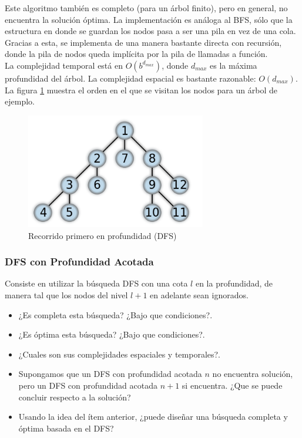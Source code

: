 \documentclass[11pt,a4paper]{article}
\begin{document}
Este algoritmo también es completo (para un árbol finito), pero en general, no encuentra la solución óptima. La implementación es análoga al BFS, sólo que la estructura en donde se guardan los nodos pasa a ser una pila en vez de una cola. Gracias a esta, se implementa de una manera bastante directa con recursión, donde la pila de nodos queda implícita por la pila de llamadas a función. \\

La complejidad temporal está en $O(b^{d_{max}})$, donde $d_{max}$ es la máxima profundidad del árbol. La complejidad espacial es bastante razonable: $O(d_{max})$. \\

La figura \ref{fig:DFS} muestra el orden en el que se visitan los nodos para un árbol de ejemplo.

{
\begin{figure}[]
  \centering
    \includegraphics[width=0.7\textwidth]{img/DFS}
  \caption{Recorrido primero en profundidad (DFS)}
  \label{fig:DFS}
\end{figure}
}

\subsubsection{DFS con Profundidad Acotada}
Consiste en utilizar la búsqueda DFS con una cota $l$ en la profundidad, de manera tal que los nodos del nivel $l+1$ en adelante sean ignorados. 
\begin{itemize}
\item ¿Es completa esta búsqueda? ¿Bajo que condiciones?.
\item ¿Es óptima esta búsqueda? ¿Bajo que condiciones?.
\item ¿Cuales son sus complejidades espaciales y temporales?.
\item Supongamos que un DFS con profundidad acotada $n$ no encuentra solución, pero un DFS con profundidad acotada $n+1$ si encuentra. ¿Que se puede concluir respecto a la solución? 
\item Usando la idea del ítem anterior, ¿puede diseñar una búsqueda completa y óptima basada en el DFS?
\end{itemize}
\end{document}

